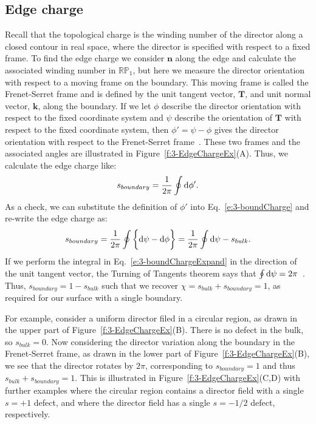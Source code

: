 \subsection{Edge charge}
Recall that the topological charge is the winding number of the director along a closed contour in real space, where the director is specified with respect to a fixed frame.
To find the edge charge we consider $\mathbf{n}$ along the edge and calculate the associated winding number in $\mathbb{R}\mathbb{P}_1$, but here we measure the director orientation with respect to a moving frame on the boundary.
This moving frame is called the Frenet-Serret frame and is defined by the unit tangent vector, $\mathbf{T}$, and unit normal vector, $\mathbf{k}$, along the boundary.
If we let $\phi$ describe the director orientation with respect to the fixed coordinate system and $\psi$ describe the orientation of $\mathbf{T}$ with respect to the fixed coordinate system, then $\phi' = \psi-\phi$ gives the director orientation with respect to the Frenet-Serret frame~\cite{RN35,RN23}.
These two frames and the associated angles are illustrated in Figure~\ref{f:3-EdgeChargeEx}(A).
Thus, we calculate the edge charge like:
\begin{equation}
  s_{boundary} = \frac{1}{2\pi} \oint \textup{d}\phi'\label{e:3-boundCharge}.
\end{equation}
As a check, we can substitute the definition of $\phi'$ into Eq.~\ref{e:3-boundCharge} and re-write the edge charge as:
\begin{equation}
  s_{boundary} = \frac{1}{2\pi} \oint \bigg \{ \textup{d}\psi - \textup{d}\phi \bigg \} = \frac{1}{2\pi} \oint \textup{d}\psi - s_{bulk}.\label{e:3-boundChargeExpand}
\end{equation}
If we perform the integral in Eq.~\ref{e:3-boundChargeExpand} in the direction of the unit tangent vector, the Turning of Tangents theorem says that $ \oint \textup{d}\psi = 2\pi$~\cite{RN35}.
Thus, $s_{boundary} = 1 - s_{bulk}$ such that we recover $\chi = s_{bulk} + s_{boundary} = 1$, as required for our surface with a single boundary.

For example, consider a uniform director filed in a circular region, as drawn in the upper part of Figure~\ref{f:3-EdgeChargeEx}(B).
There is no defect in the bulk, so $s_{bulk} = 0$.
Now considering the director variation along the boundary in the Frenet-Serret frame, as drawn in the lower part of Figure~\ref{f:3-EdgeChargeEx}(B), we see that the director rotates by $2 \pi$, corresponding to $s_{boundary} = 1$ and thus $s_{bulk} + s_{boundary} = 1$.
This is illustrated in Figure~\ref{f:3-EdgeChargeEx}(C,D) with further examples where the circular region contains a director field with a single $s = +1$ defect, and where the director field has a single $s=-1/2$ defect, respectively.

